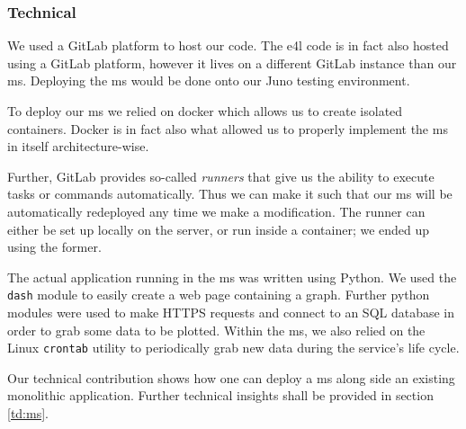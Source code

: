 \subsubsection{Technical}

We used a GitLab platform to host our code. The \gls{e4l} code is in
fact also hosted using a GitLab platform, however it lives on a
different GitLab instance than our \gls{ms}. Deploying the \gls{ms}
would be done onto our Juno testing environment.

To deploy our \gls{ms} we relied on docker which allows us to create
isolated containers. Docker is in fact also what allowed us to
properly implement the \gls{ms} in itself architecture-wise.

Further, GitLab provides so-called \textit{runners} that give us the
ability to execute tasks or commands automatically. Thus we can make
it such that our \gls{ms} will be automatically redeployed any time we
make a modification. The runner can either be set up locally on the
server, or run inside a container; we ended up using the former.

The actual application running in the \gls{ms} was written using
Python. We used the \verb|dash| module to easily create a web page
containing a graph. Further python modules were used to make HTTPS
requests and connect to an SQL database in order to grab some data to
be plotted.  Within the \gls{ms}, we also relied on the Linux
\verb|crontab| utility to periodically grab new data during the
service's life cycle. 

Our technical contribution shows how one can deploy a \gls{ms} along
side an existing monolithic application. Further technical insights
shall be provided in section \vref{td:ms}.

